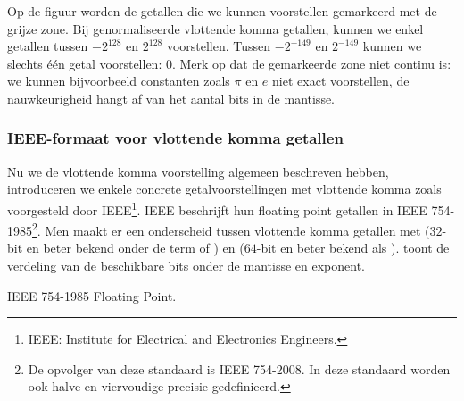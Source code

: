 
Op de figuur worden de getallen die we kunnen voorstellen gemarkeerd met de grijze zone. Bij genormaliseerde vlottende komma getallen, kunnen we enkel getallen tussen $-2^{128}$ en $2^{128}$ voorstellen. Tussen $-2^{-149}$ en $2^{-149}$ kunnen we slechts \'e\'en getal voorstellen: $0$. Merk op dat de gemarkeerde zone niet continu is: we kunnen bijvoorbeeld constanten zoals $\pi$ en $e$ niet exact voorstellen, de nauwkeurigheid hangt af van het aantal bits in de mantisse.

\subsubsection{IEEE-formaat voor vlottende komma getallen}
Nu we de vlottende komma voorstelling algemeen beschreven hebben, introduceren we enkele concrete getalvoorstellingen met vlottende komma zoals voorgesteld door IEEE\footnote{IEEE: Institute for Electrical and Electronics Engineers.}. IEEE beschrijft hun floating point getallen in IEEE 754-1985\footnote{De opvolger van deze standaard is IEEE 754-2008\cite{5976968}. In deze standaard worden ook halve en viervoudige precisie gedefinieerd.}\cite{30711}. Men maakt er een onderscheid tussen vlottende komma getallen met  ($32$-bit en beter bekend onder de term  of ) en  ($64$-bit en beter bekend als ).  toont de verdeling van de beschikbare bits onder de mantisse en exponent.

\begin{table}[hbt]
\centering
{}
\caption{IEEE 754-1985 Floating Point.}
\end{table}

